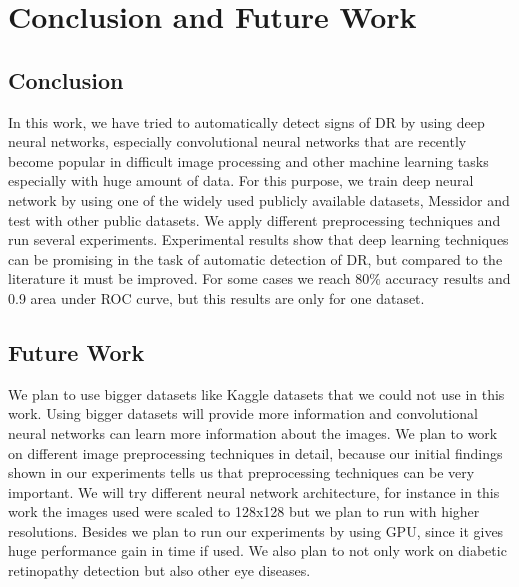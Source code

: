 \chapter{Conclusion and Future Work}
\label{conclusion}
\section{Conclusion}
In this work, we have tried to automatically detect signs of DR by using deep neural networks, especially convolutional neural networks that are recently become popular in difficult image processing and other machine learning tasks especially with huge amount of data. For this purpose, we train deep neural network by using one of the widely used publicly available datasets, Messidor and test with other public datasets. We apply different preprocessing techniques and run several experiments. Experimental results show that deep learning techniques can be promising in the task of automatic detection of DR, but compared to the literature it must be improved. For some cases we reach 80\% accuracy results and 0.9 area under ROC curve, but this results are only for one dataset.  
\section{Future Work}
We plan to use bigger datasets like Kaggle datasets that we could not use in this work. Using bigger datasets will provide more information and convolutional neural networks can learn more information about the images. We plan to work on different image preprocessing techniques in detail, because our initial findings shown in our experiments tells us that preprocessing techniques can be very important. We will try different neural network architecture, for instance in this work the images used were scaled to 128x128 but we plan to run with higher resolutions. Besides we plan to run our experiments by using GPU, since it gives huge performance gain in time if used. We also plan to not only work on diabetic retinopathy detection but also other eye diseases. 
